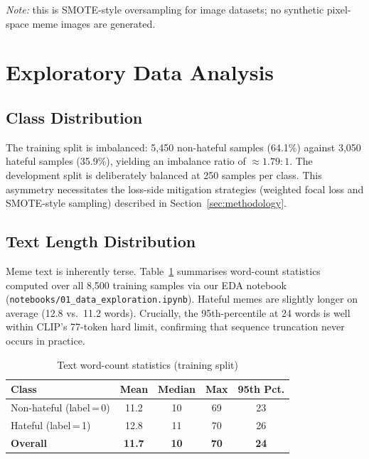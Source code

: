\documentclass[12pt,a4paper]{article}
\begin{document}
\textit{Note:} this is SMOTE-style oversampling for image datasets; no synthetic pixel-space meme images are generated.

\section{Exploratory Data Analysis}
\label{sec:eda}

\subsection{Class Distribution}

The training split is imbalanced: 5,450 non-hateful samples (64.1\%) against 3,050 hateful samples (35.9\%), yielding an imbalance ratio of $\approx 1.79\!:\!1$. The development split is deliberately balanced at 250 samples per class. This asymmetry necessitates the loss-side mitigation strategies (weighted focal loss and SMOTE-style sampling) described in Section~\ref{sec:methodology}.

\subsection{Text Length Distribution}

Meme text is inherently terse. Table~\ref{tab:textlen} summarises word-count statistics computed over all 8,500 training samples via our EDA notebook (\texttt{notebooks/01\_data\_exploration.ipynb}). Hateful memes are slightly longer on average (12.8 vs.\ 11.2 words). Crucially, the 95th-percentile at 24 words is well within CLIP's 77-token hard limit, confirming that sequence truncation never occurs in practice.

\begin{table}[H]
  \centering
  \caption{Text word-count statistics (training split)}
  \renewcommand{\arraystretch}{1.3}
  \begin{tabular}{lcccc}
    \toprule
    \rowcolor{primaryblue!15}
    \textbf{Class}           & \textbf{Mean} & \textbf{Median} & \textbf{Max} & \textbf{95th Pct.} \\
    \midrule
    Non-hateful (label\,=\,0) & 11.2          & 10              & 69           & 23 \\
    Hateful     (label\,=\,1) & 12.8          & 11              & 70           & 26 \\
    \textbf{Overall}          & \textbf{11.7} & \textbf{10}     & \textbf{70}  & \textbf{24} \\
    \bottomrule
  \end{tabular}
  \label{tab:textlen}
\end{table}
\end{document}
